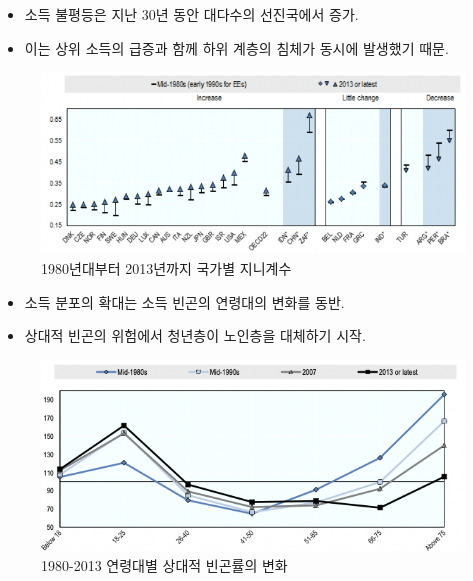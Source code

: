 \documentclass[aspectratio=169,xcolor=dvipsnames,handout]{beamer}
\begin{document}
\begin{frame}{}
    \begin{itemize}
        \item 소득 불평등은 지난 30년 동안 대다수의 선진국에서 증가.
        \item 이는 상위 소득의 급증과 함께 하위 계층의 침체가 동시에 발생했기 때문.
    \end{itemize}
    \begin{figure}
        \centering
        \includegraphics[scale=.3]{pic/tpin2.1.png}
        \caption{1980년대부터 2013년까지 국가별 지니계수}
    \end{figure}
\end{frame}

\begin{frame}{}
    \begin{itemize}
        \item 소득 분포의 확대는 소득 빈곤의 연령대의 변화를 동반.
        \item  상대적 빈곤의 위험에서 청년층이 노인층을 대체하기 시작.
    \end{itemize}
    \begin{figure}
        \centering
        \includegraphics[scale=.3]{pic/tpin2.2.png}
        \caption{1980-2013 연령대별 상대적 빈곤률의 변화}
    \end{figure}
\end{frame}
\end{document}
